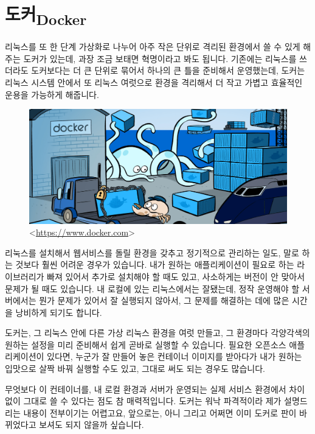 \documentclass[11pt,a4paper]{article}
\newcommand{\sub}[1]{\textsubscript{#1}}
\begin{document}
\section[도커]{도커\sub{Docker}}

리눅스를 또 한 단계 가상화로 나누어 아주 작은 단위로 격리된 환경에서 쓸 수 있게 해주는 도커가 있는데, 과장 조금 보태면 혁명이라고 봐도 됩니다. 기존에는 리눅스를 쓰더라도 도커보다는 더 큰 단위로 묶어서 하나의 큰 틀을 준비해서 운영했는데, 도커는 리눅스 시스템 안에서 또 리눅스 여럿으로 환경을 격리해서 더 작고 가볍고 효율적인 운용을 가능하게 해줍니다.

\begin{figure}[H]
\centering
\includegraphics[width=1\textwidth]{docker.png}
\caption{<\url{https://www.docker.com}>}
\end{figure}

리눅스를 설치해서 웹서비스를 돌릴 환경을 갖추고 정기적으로 관리하는 일도, 말로 하는 것보다 훨씬 어려운 경우가 있습니다. 내가 원하는 애플리케이션이 필요로 하는 라이브러리가 빠져 있어서 추가로 설치해야 할 때도 있고, 사소하게는 버전이 안 맞아서 문제가 될 때도 있습니다. 내 로컬에 있는 리눅스에서는 잘됐는데, 정작 운영해야 할 서버에서는 뭔가 문제가 있어서 잘 실행되지 않아서, 그 문제를 해결하는 데에 많은 시간을 낭비하게 되기도 합니다.

도커는, 그 리눅스 안에 다른 가상 리눅스 환경을 여럿 만들고, 그 환경마다 각양각색의 원하는 설정을 미리 준비해서 쉽게 곧바로 실행할 수 있습니다. 필요한 오픈소스 애플리케이션이 있다면, 누군가 잘 만들어 놓은 컨테이너 이미지를 받아다가 내가 원하는 입맛으로 살짝 바꿔 실행할 수도 있고, 그대로 써도 되는 경우도 많습니다.

무엇보다 이 컨테이너를, 내 로컬 환경과 서버가 운영되는 실제 서비스 환경에서 차이 없이 그대로 쓸 수 있다는 점도 참 매력적입니다. 도커는 워낙 파격적이라 제가 설명드리는 내용이 전부이기는 어렵고요, 앞으로는, 아니 그리고 어쩌면 이미 도커로 판이 바뀌었다고 보셔도 되지 않을까 싶습니다.
\end{document}
